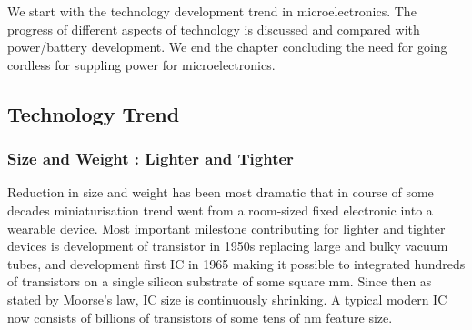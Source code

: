 \documentclass[12pt,a4paper,UKenglish]{report}
\begin{document}
We start with the technology development trend in microelectronics. The progress of different aspects of 
technology is discussed and compared with power/battery development. We end the chapter concluding the need for
going cordless for suppling power for microelectronics.

\subsection{Technology Trend}

\subsubsection{Size and Weight : Lighter and Tighter}


Reduction in size and weight has been most dramatic that in course of some decades miniaturisation trend went 
from a room-sized fixed electronic into a wearable device. Most important milestone contributing for lighter and 
tighter devices is development of transistor in 1950s replacing large and bulky vacuum tubes, and  
development first IC in 1965 making it possible to integrated hundreds of transistors on a single silicon substrate of 
some square mm. Since then as stated by Moorse's law, IC size is continuously shrinking. A typical modern IC now 
consists of billions of transistors of some  tens of nm feature size. \\
\end{document}
